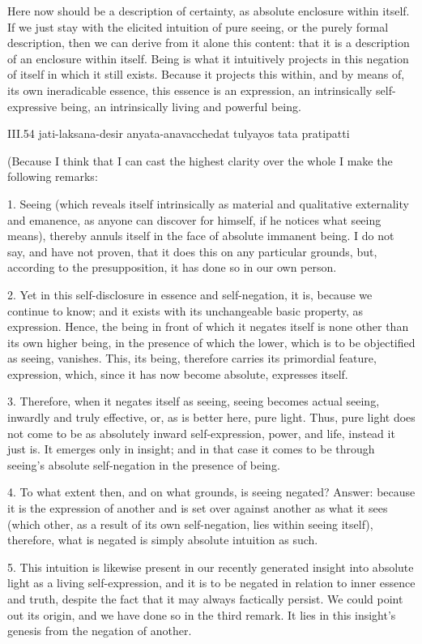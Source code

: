 Here now should be a description of certainty,
as absolute enclosure within itself.
If we just stay with the elicited intuition of pure seeing,
or the purely formal description,
then we can derive from it alone this content:
that it is a description of an enclosure within itself.
Being is what it intuitively projects
in this negation of itself in which it still exists.
Because it projects this within, and by means of,
its own ineradicable essence, this essence is an expression,
an intrinsically self-expressive being,
an intrinsically living and powerful being.

III.54
jati-laksana-desir anyata-anavacchedat tulyayos tata pratipatti

(Because I think that I can cast
the highest clarity over the whole
I make the following remarks:

1. Seeing
(which reveals itself intrinsically
as material and qualitative externality and emanence,
as anyone can discover for himself,
if he notices what seeing means),
thereby annuls itself in the face
of absolute immanent being.
I do not say, and have not proven,
that it does this on any particular grounds,
but, according to the presupposition,
it has done so in our own person.

2.  Yet in this self-disclosure
in essence and self-negation,
it is, because we continue to know;
and it exists with its unchangeable basic property,
as expression.
Hence, the being in front of which
it negates itself is none other
than its own higher being,
in the presence of which the lower,
which is to be objectified as seeing, vanishes.
This, its being, therefore carries its
primordial feature, expression,
which, since it has now become absolute,
expresses itself.

3. Therefore, when it negates itself as seeing,
seeing becomes actual seeing,
inwardly and truly effective,
or, as is better here, pure light.
Thus, pure light does not come to be as
absolutely inward self-expression, power, and life,
instead it just is.
It emerges only in insight;
and in that case it comes to be
through seeing's absolute self-negation
in the presence of being.

4. To what extent then,
and on what grounds,
is seeing negated?
Answer: because it is the expression of another
and is set over against another as what it sees
(which other, as a result of its own self-negation,
lies within seeing itself),
therefore, what is negated
is simply absolute intuition as such.

5. This intuition is likewise present
in our recently generated insight into
absolute light as a living self-expression,
and it is to be negated in relation to
inner essence and truth,
despite the fact that it may
always factically persist.
We could point out its origin,
and we have done so in the third remark.
It lies in this insight's genesis
from the negation of another.

